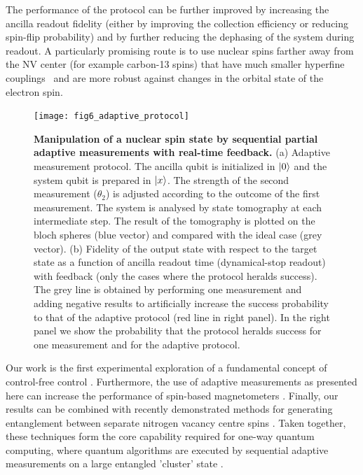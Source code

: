 The performance of the protocol can be further improved by increasing the ancilla readout fidelity (either by improving the collection efficiency or reducing spin-flip probability) and by further reducing the dephasing of the system during readout. A particularly promising route is to use nuclear spins farther away from the NV center (for example carbon-13 spins) that have much smaller hyperfine couplings~\cite{Zhao_NatureNano_2012,Taminiau_PRL_2012,Kolkowitz_PRL_2012} and are more robust against changes in the orbital state of the electron spin.

\begin{figure}
	\centering
	\texttt{[image: fig6\_adaptive\_protocol]}
	\caption{\label{fig:amc-fig6} \textbf{Manipulation of a nuclear spin state by sequential partial adaptive measurements with real-time feedback.} (a) Adaptive measurement protocol. The ancilla qubit is initialized in $\left|0\right>$ and the system qubit is prepared in $\left|x\right>$. The strength of the second measurement ($\theta_2$) is adjusted according to the outcome of the first measurement. The system is analysed by state tomography at each intermediate step. The result of the tomography is plotted on the bloch spheres (blue vector) and compared with the ideal case (grey vector). (b) Fidelity of the output state with respect to the target state as a function of ancilla readout time (dynamical-stop readout) with feedback (only the cases where the protocol heralds success). The grey line is obtained by performing one measurement and adding negative results to artificially increase the success probability to that of the adaptive protocol (red line in right panel). In the right panel we show the probability that the protocol heralds success for one measurement and for the adaptive protocol.  }
\end{figure}

Our work is the first experimental exploration of a fundamental concept of control-free control \cite{Jordan_PRB_2006, Ashhab_PhysRevA_2010, Wiseman_NatureNV_2011} . Furthermore, the use of adaptive measurements as presented here can increase the performance of spin-based magnetometers \cite{Cappellaro_PhysRevA_2012, Higgins_Nature_2007}. Finally, our results can be combined with recently demonstrated methods for generating entanglement between separate nitrogen vacancy centre spins \cite{Bernien_Nature_2013, Dolde_NatPhys_2013}. Taken together, these techniques form the core capability required for one-way quantum computing, where quantum algorithms are executed by sequential adaptive measurements on a large entangled 'cluster' state \cite{Raussendorf_PRL_2001, Prevedel_Nature_2007}.

